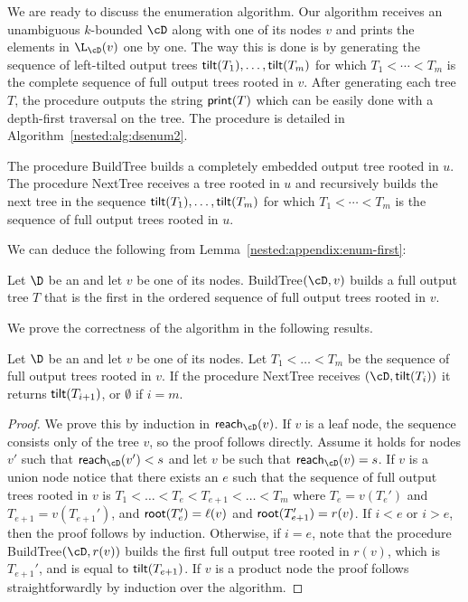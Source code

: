 We are ready to discuss the enumeration algorithm. Our algorithm receives an unambiguous $k$-bounded \dsabbr $\cD$ along with one of its nodes $v$ and prints the elements in $\L_{\cD}(v)$ one by one. The way this is done is by generating the sequence of left-tilted output trees ${\sf tilt}(T_1),\ldots,{\sf tilt}(T_m)$ for which $T_1 < \cdots < T_m$ is the complete sequence of full output trees rooted in $v$. After generating each tree $T$, the procedure outputs the string ${\sf print}(T)$ which can be easily done with a depth-first traversal on the tree. The procedure is detailed in Algorithm~\ref{nested:alg:dsenum2}.

The procedure {\sc BuildTree} builds a completely embedded output tree rooted in $u$. The procedure {\sc NextTree} receives a tree rooted in $u$ and recursively builds the next tree in the sequence ${\sf tilt}(T_1),\ldots,{\sf tilt}(T_m)$ for which $T_1 < \cdots < T_m$ is the sequence of full output trees rooted in $u$. 

We can deduce the following from Lemma~\ref{nested:appendix:enum-first}:
\begin{corollary}
	Let $\D$ be an \dsabbr and let $v$ be one of its nodes. {\sc BuildTree}$(\cD,v)$ builds a full output tree $T$ that is the first in the ordered sequence of full output trees rooted in $v$.
\end{corollary}

We prove the correctness of the algorithm in the following results.

\begin{lemma}\label{nested:appendix:enum-correctlemma}
	Let $\D$ be an \dsabbr and let $v$ be one of its nodes. Let $T_1<\ldots<T_m$ be the sequence of full output trees rooted in $v$. If the procedure {\sc NextTree} receives $(\cD,{\sf tilt}(T_i))$ it returns ${\sf tilt}(T_{i+1})$, or $\emptyset$ if $i = m$.
\end{lemma}
\begin{proof}
	We prove this by induction in ${\sf reach}_{\cD}(v)$. If $v$ is a leaf node, the sequence consists only of the tree $v$, so the proof follows directly. 
	Assume it holds for nodes $v'$ such that ${\sf reach}_{\cD}(v') < s$ and let $v$ be such that ${\sf reach}_{\cD}(v) = s$. 
	If $v$ is a union node notice that there exists an $e$ such that the sequence of full output trees rooted in $v$ is $T_1<\ldots<T_e<T_{e+1}<\ldots<T_m$ where $T_e = v(T_e')$ and $T_{e+1} = v(T_{e+1}')$, and ${\sf root}(T_e') = \ell(v)$ and ${\sf root}(T_{e+1}') = r(v)$. 
	If $i < e$ or $i > e$, then the proof follows by induction. Otherwise, if $i = e$, note that the procedure {\sc BuildTree}$(\cD,r(v))$ builds the first full output tree rooted in $r(v)$, which is $T_{e+1}'$, and is equal to ${\sf tilt}(T_{e+1})$. 
	If $v$ is a product node the proof follows straightforwardly by induction over the algorithm.
\end{proof}

